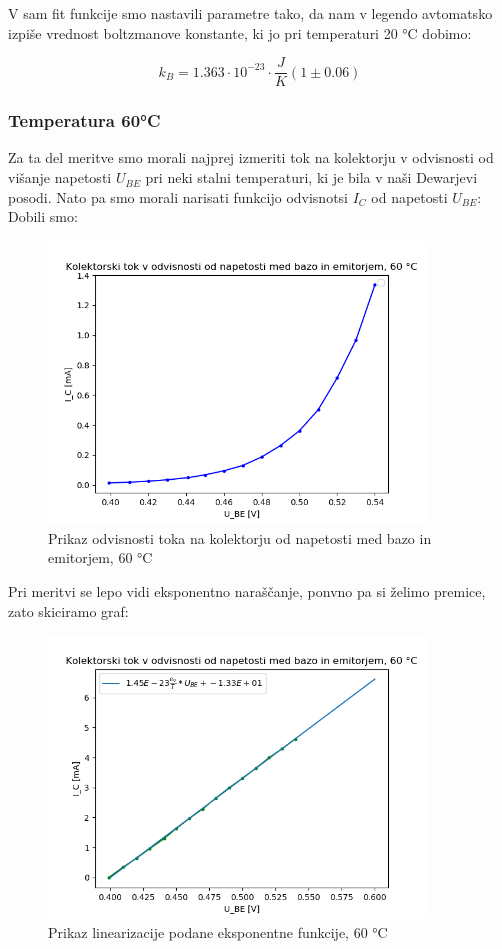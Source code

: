 \documentclass[11pt, a4paper]{article}
\theoremstyle{definition}
\theoremstyle{example}
\theoremstyle{izrek}
\begin{document}
V sam fit funkcije smo nastavili parametre tako, da nam v legendo avtomatsko izpiše vrednost boltzmanove konstante, ki jo pri temperaturi 20 °C dobimo:

$$k_B=1.363\cdot 10^{-23} \cdot \frac{J}{K} (1 \pm 0.06)$$

\subsubsection{Temperatura 60°C}
Za ta del meritve smo morali najprej izmeriti tok na kolektorju v odvisnosti od višanje napetosti $U_{BE}$ pri neki stalni temperaturi, ki je bila v naši Dewarjevi posodi. Nato pa smo morali narisati funkcijo odvisnotsi $I_C$ od napetosti $U_{BE}$:
Dobili smo:
\begin{figure}[H]
    \centering
    \includegraphics[width=10cm]{Napetost-tok,60.png}
    \caption{Prikaz odvisnosti toka na kolektorju od napetosti med bazo in emitorjem, 60 °C}
\end{figure}
Pri meritvi se lepo vidi eksponentno naraščanje, ponvno pa si želimo premice, zato skiciramo graf: 
\begin{figure}[H]
    \centering
    \includegraphics[width=10cm]{Napetost-tok_fit,60.png}
    \caption{Prikaz linearizacije podane eksponentne funkcije, 60 °C}
\end{figure}
\end{document}

